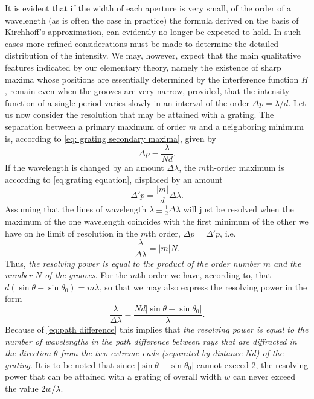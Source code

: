 \documentclass[12pt,twoside,english]{book}
\renewcommand{\~}{\perispomeni}%
\numberwithin{equation}{section}
\numberwithin{figure}{section}
\begin{document}
It is evident that if the width of each aperture is very small, of the order of a wavelength (as is often the case in practice) the formula derived on the basis of Kirchhoff's approximation, can evidently no longer be expected to hold. In such cases more refined considerations must be made to determine the detailed distribution of the intensity. We may, however, expect that the main qualitative features indicated by our elementary theory, namely the existence of sharp maxima whose positions are essentially determined by the interference function $H$, remain even when the grooves are very narrow, provided, that the intensity function of a single period varies slowly in an interval of the order $\Delta p=\lambda/d$. Let us now consider the resolution that may be attained with a grating. The separation between a primary maximum of order $m$ and a neighboring minimum is, according to \ref{eq: grating secondary maxima}, given by
\begin{equation}
\Delta p=\frac{\lambda}{Nd}.
\end{equation}
If the wavelength is changed by an amount $\Delta\lambda$, the $m$th-order maximum is according to \ref{eq:grating equation}, displaced by an amount
\begin{equation}
\Delta'p=\frac{\left|m\right|}{d}\Delta\lambda.
\end{equation}
Assuming that the lines of wavelength $\lambda\pm\frac{1}{2}\Delta\lambda$ will just be resolved when the maximum of the one wavelength coincides with the first minimum of the other we have on he limit of resolution in the $m$th order, $\Delta p=\Delta'p$, i.e.
\begin{equation}
\frac{\lambda}{\Delta\lambda}=\left|m\right|N.
\label{eq:resolving power}
\end{equation}
Thus, \emph{the resolving power is equal to the product of the order number $m$ and the number $N$ of the grooves}. For the $m$th order we have, according to, that $d\left(\sin\theta-\sin\theta_{0}\right)=m\lambda$, so that we may also express the resolving power in the form
\begin{equation}
\frac{\lambda}{\Delta\lambda}=\frac{Nd\left|\sin\theta-\sin\theta_{0}\right|}{\lambda}.
\end{equation}
Because of \ref{eq:path difference} this implies that \emph{the resolving power is equal to the number of wavelengths in the path difference between rays that are diffracted in the direction $\theta$ from the two extreme ends (separated by distance Nd) of the grating}.
It is to be noted that since $\left|\sin\theta-\sin\theta_{0}\right|$ cannot exceed 2, the resolving power that can be attained with a grating of overall width $w$ can never exceed the value $2w/\lambda$.
\end{document}
